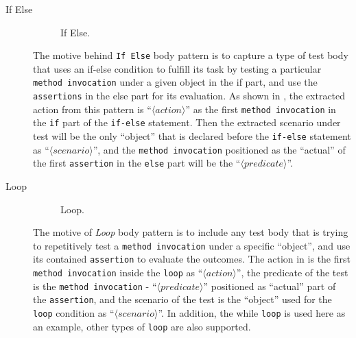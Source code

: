 \documentclass[proposal.tex]{subfiles}
\begin{document}
\begin{description}

\item[If Else]

\begin{figure}[t]
\centering
    \begin{subfigure}{0.6\textwidth}
    \end{subfigure}
\caption{If Else.}
\label{ifElse}
\end{figure}


The motive behind \texttt{If Else} body pattern is to capture a type of test body that uses an if-else condition to fulfill its task by testing a particular \texttt{method invocation} under a given object in the if part, and use the \texttt{assertions} in the else part for its evaluation.
%
As shown in , the extracted action from this pattern is \enquote{$\langle action \rangle$} as the first \texttt{method invocation} in the \texttt{if} part of the \texttt{if-else} statement.
%
Then the extracted scenario under test will be the only \enquote{object} that is declared before the \texttt{if-else} statement as \enquote{$\langle scenario \rangle$}, and the \texttt{method invocation} positioned as the \enquote{actual} of the first \texttt{assertion} in the \texttt{else} part will be the \enquote{$\langle predicate \rangle$}.


\item[Loop]

\begin{figure}[t]
\centering
    \begin{subfigure}{0.65\textwidth}
    \end{subfigure}
\caption{Loop.}
\label{loopPattern}
\end{figure}


The motive of \textit{Loop} body pattern is to include any test body that is trying to repetitively test a \texttt{method invocation} under a specific \enquote{object}, and use its contained \texttt{assertion} to evaluate the outcomes.
%
The action in  is the first \texttt{method invocation} inside the \texttt{loop} as \enquote{$\langle action \rangle$}, the predicate of the test is the \texttt{method invocation} - \enquote{$\langle predicate \rangle$} positioned as \enquote{actual} part of the \texttt{assertion}, and the scenario of the test is the \enquote{object} used for the \texttt{loop} condition as \enquote{$\langle scenario \rangle$}.
%
In addition, the while \texttt{loop} is used here as an example, other types of \texttt{loop} are also supported.



\end{description}
\end{document}
